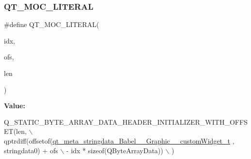 \subsubsection{\texorpdfstring{Q\+T\+\_\+\+M\+O\+C\+\_\+\+L\+I\+T\+E\+R\+AL}{QT\_MOC\_LITERAL}}
{\footnotesize\ttfamily \#define Q\+T\+\_\+\+M\+O\+C\+\_\+\+L\+I\+T\+E\+R\+AL(\begin{DoxyParamCaption}\item[{}]{idx,  }\item[{}]{ofs,  }\item[{}]{len }\end{DoxyParamCaption})}

{\bfseries Value\+:}
\begin{DoxyCode}
Q\_STATIC\_BYTE\_ARRAY\_DATA\_HEADER\_INITIALIZER\_WITH\_OFFSET(len, \(\backslash\)
    qptrdiff(offsetof(\hyperlink{structqt__meta__stringdata__Babel____Graphic____customWidget__t}{qt\_meta\_stringdata\_Babel\_\_Graphic\_\_customWidget\_t}
      , stringdata0) + ofs \(\backslash\)
        - idx * \textcolor{keyword}{sizeof}(QByteArrayData)) \(\backslash\)
    )
\end{DoxyCode}
